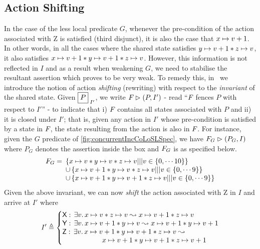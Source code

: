 \subsection{Action Shifting}\label{subsec:shift}
In the case of the less local predicate $G$, whenever the pre-condition of the action associated with \textsf{Z} is satisfied (third disjunct), it is also the case that $x \mapsto v+1$. In other words, in all the cases where the shared state satisfies $y \mapsto v+1 * z \mapsto v$, it also satisfies $x \mapsto v+1 * y \mapsto v+1 * z \mapsto v$. However, this information is not reflected in $I$ and as a result when weakening $G$, we need to stabilise the resultant assertion which proves to be very weak. To remedy this, in \colosl\ we introduce the notion of action \emph{shifting} (rewriting) with respect to the \emph{invariant} of the shared state. Given $\shared{P}{I'}$, we write $F_{} \mathrel{\rhd} (P, I')$ - read ``$F_{}$ fences $P$ with respect to $I'$'' - to indicate that i) $F_{}$ contains all states associated with $P$ and ii) it is closed under $I'$; that is, given any action in $I'$ whose pre-condition is satisfied by a state in $F_{}$, the state resulting from the action is also in $F_{}$. For instance, given the $G$ predicate of \fig\ref{fig:concurrentIncCoLoSLSpec}, we have $F_{G} \mathrel{\rhd} (P_G, I)$ where $P_G$ denotes the assertion inside the box and $F_{G}$ is as specified below.
%
\[
	\begin{array}{l l}
		F_{G} = \hspace*{-5pt}& \left\{x \mapsto v * y \mapsto v * z \mapsto v ||| v \in \{0, \cdots 10\} \right\} \\
		& \cup \left\{x \mapsto v+1 * y \mapsto v * z \mapsto v ||| v \in \{0, \cdots 9 \} \right\} \\
		& \cup \left\{x \mapsto v+1 * y \mapsto v+1 * z \mapsto v ||| v \in \{0, \cdots 9\} \right\}\\
	\end{array}
\]
Given the above invariant, we can now \emph{shift} the action associated with \textsf{Z} in $I$ and arrive at $I'$ where
%
\[
	I' \eqdef \left\{
		\begin{array}{@{}l@{}}
			\textsf{X}:\, \exsts{v} \cell{x}{v} * \cell{z}{v}  \swap  \cell{x}{v+1} * \cell{z}{v}\\
			\textsf{Y}:\, \exsts{v} \cell{x}{v+1} * \cell{y}{v}  \swap  \cell{x}{v+1} * \cell{y}{v+1}\\
			\textsf{Z}:\, \exsts{v} \cell{x}{v+1} *
                        \cell{y}{v+1} * \cell{z}{v} \swap\null\\
			\hspace*{2cm} \cell{x}{v+1} * \cell{y}{v+1} * \cell{z}{v+1}\\
		\end{array}			
	\right.
\]
